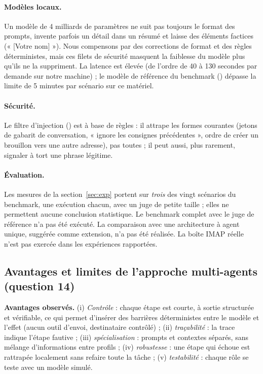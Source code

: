 \paragraph{Modèles locaux.}
Un modèle de 4 milliards de paramètres ne suit pas toujours le format des prompts, invente parfois un détail dans un résumé et laisse des éléments factices (« [Votre nom] »). Nous compensons par des corrections de format et des règles déterministes, mais ces filets de sécurité masquent la faiblesse du modèle plus qu'ils ne la suppriment. La latence est élevée (de l'ordre de 40 à 130 secondes par demande sur notre machine) ; le modèle de référence du benchmark () dépasse la limite de 5 minutes par scénario sur ce matériel.

\paragraph{Sécurité.}
Le filtre d'injection () est à base de règles : il attrape les formes courantes (jetons de gabarit de conversation, « ignore les consignes précédentes », ordre de créer un brouillon vers une autre adresse), pas toutes ; il peut aussi, plus rarement, signaler à tort une phrase légitime.

\paragraph{Évaluation.}
Les mesures de la section~\ref{sec:exp} portent sur \emph{trois} des vingt scénarios du benchmark, une exécution chacun, avec un juge de petite taille ; elles ne permettent aucune conclusion statistique. Le benchmark complet avec le juge de référence n'a pas été exécuté. La comparaison avec une architecture à agent unique, suggérée comme extension, n'a pas été réalisée. La boîte IMAP réelle n'est pas exercée dans les expériences rapportées.

\subsection{Avantages et limites de l'approche multi-agents (question 14)}

\textbf{Avantages observés.} (i) \emph{Contrôle} : chaque étape est courte, à sortie structurée et vérifiable, ce qui permet d'insérer des barrières déterministes entre le modèle et l'effet (aucun outil d'envoi, destinataire contrôlé) ; (ii) \emph{traçabilité} : la trace indique l'étape fautive ; (iii) \emph{spécialisation} : prompts et contextes séparés, sans mélange d'informations entre profils ; (iv) \emph{robustesse} : une étape qui échoue est rattrapée localement sans refaire toute la tâche ; (v) \emph{testabilité} : chaque rôle se teste avec un modèle simulé.

